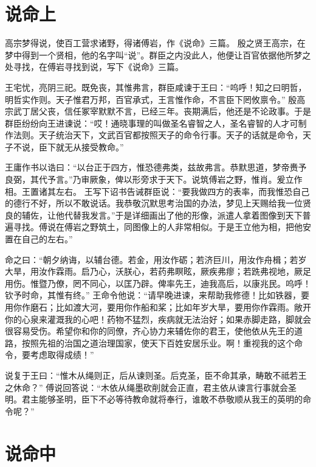 \documentclass[a4paper,12pt,UTF8,twoside]{ctexbook}
\begin{document}
\chapter{说命上}

高宗梦得说，使百工营求诸野，得诸傅岩，作《说命》三篇。
殷之贤王高宗，在梦中得到一个贤相，他的名字叫“说”。群臣之内没此人，他便让百官依据他所梦之处寻找，在傅岩寻找到说，写下《说命》三篇。

王宅忧，亮阴三祀。既免丧，其惟弗言，群臣咸谏于王曰：“呜呼！知之曰明哲，明哲实作则。天子惟君万邦，百官承式，王言惟作命，不言臣下罔攸禀令。”
殷高宗武丁居父丧，信任冢宰默默不言，已经三年。丧期满后，他还是不论政事。于是群臣纷纷向王进谏说：“哎！通晓事理的叫做圣名睿智之人，圣名睿智的人才可制作法则。天子统治天下，文武百官都按照天子的命令行事。天子的话就是命令，天子不说，臣下就无从接受教命。”

王庸作书以诰曰：“以台正于四方，惟恐德弗类，兹故弗言。恭默思道，梦帝赉予良弼，其代予言。”乃审厥象，俾以形旁求于天下。说筑傅岩之野，惟肖。爰立作相。王置诸其左右。
王写下诏书告诫群臣说：“要我做四方的表率，而我惟恐自己的德行不好，所以不敢说话。我恭敬沉默思考治国的办法，梦见上天赐给我一位贤良的辅佐，让他代替我发言。”于是详细画出了他的形像，派遣人拿着图像到天下普遍寻找。傅说在傅岩之野筑土，同图像上的人非常相似。于是王立他为相，把他安置在自己的左右。”

命之曰：“朝夕纳诲，以辅台德。若金，用汝作砺；若济巨川，用汝作舟楫；若岁大旱，用汝作霖雨。启乃心，沃朕心，若药弗瞑眩，厥疾弗瘳；若跣弗视地，厥足用伤。惟暨乃僚，罔不同心，以匡乃辟。俾率先王，迪我高后，以康兆民。呜呼！钦予时命，其惟有终。”
王命令他说：“请早晚进谏，来帮助我修德！比如铁器，要用你作磨石；比如渡大河，要用你作船和桨；比如年岁大旱，要用你作霖雨。敞开你的心泉来灌溉我的心吧！药物不猛烈，疾病就无法治好；如果赤脚走路，脚就会很容易受伤。希望你和你的同僚，齐心协力来辅佐你的君王，使他依从先王的道路，按照先祖的治国之道治理国家，使天下百姓安居乐业。啊！重视我的这个命令，要考虑取得成绩！”

说复于王曰：“惟木从绳则正，后从谏则圣。后克圣，臣不命其承，畴敢不祗若王之休命？”
傅说回答说：“木依从绳墨砍削就会正直，君主依从谏言行事就会圣明。君主能够圣明，臣下不必等待教命就将奉行，谁敢不恭敬顺从我王的英明的命令呢？”

\chapter{说命中}
\end{document}
